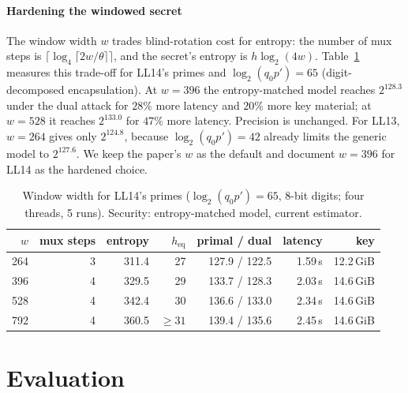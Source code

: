 \documentclass[sigconf,nonacm]{acmart}
\newcommand{\lgqp}{\log_2(q_0 p')}
\begin{document}
\paragraph{Hardening the windowed secret}
The window width $w$ trades blind-rotation cost for entropy: the number of mux steps is $\lceil\log_4\lceil 2w/\theta\rceil\rceil$, and the secret's entropy is $h\log_2(4w)$.
Table~\ref{tab:window} measures this trade-off for LL14's primes and $\lgqp=65$ (digit-decomposed encapsulation).
At $w=396$ the entropy-matched model reaches $2^{128.3}$ under the dual attack for $28\%$ more latency and $20\%$ more key material; at $w=528$ it reaches $2^{133.0}$ for $47\%$ more latency.
Precision is unchanged.
For LL13, $w=264$ gives only $2^{124.8}$, because $\lgqp=42$ already limits the generic model to $2^{127.6}$.
We keep the paper's $w$ as the default and document $w=396$ for LL14 as the hardened choice.

\begin{table}[t]
\caption{Window width for LL14's primes ($\lgqp=65$, 8-bit digits; four threads, 5 runs). Security: entropy-matched model, current estimator.}
\label{tab:window}
\small
\setlength{\tabcolsep}{3pt}
\begin{tabular}{rrrrrrr}
\toprule
$w$ & mux steps & entropy & $h_{\mathrm{eq}}$ & primal / dual & latency & key \\
\midrule
264 & 3 & 311.4 & 27 & 127.9 / 122.5 & 1.59\,s & 12.2\,GiB \\
396 & 4 & 329.5 & 29 & 133.7 / 128.3 & 2.03\,s & 14.6\,GiB \\
528 & 4 & 342.4 & 30 & 136.6 / 133.0 & 2.34\,s & 14.6\,GiB \\
792 & 4 & 360.5 & $\ge 31$ & 139.4 / 135.6 & 2.45\,s & 14.6\,GiB \\
\bottomrule
\end{tabular}
\end{table}

\section{Evaluation}
\label{sec:eval}
\end{document}
